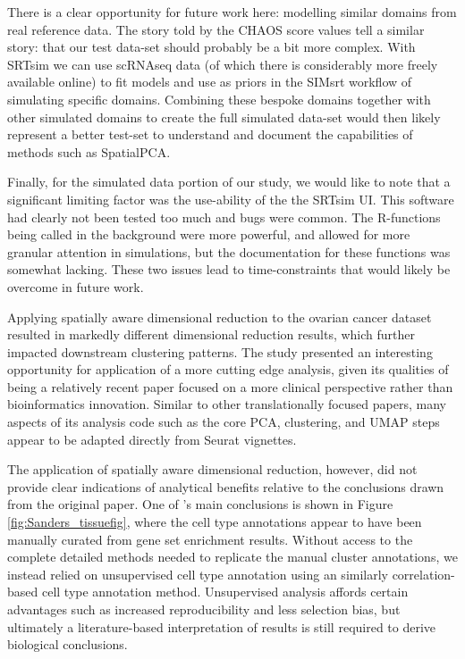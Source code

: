 \documentclass{article}
\begin{document}
There is a clear opportunity for future work here: modelling similar domains from real reference data. The story told by the CHAOS score values tell a similar story: that our test data-set should probably be a bit more complex. With SRTsim we can use scRNAseq data (of which there is considerably more freely available online) to fit models and use as priors in the SIMsrt workflow of simulating specific domains. Combining these bespoke domains together with other simulated domains to create the full simulated data-set would then likely represent a better test-set to understand and document the capabilities of methods such as SpatialPCA. 

Finally, for the simulated data portion of our study, we would like to note that a significant limiting factor was the use-ability of the the SRTsim UI. This software had clearly not been tested too much and bugs were common. The R-functions being called in the background were more powerful, and allowed for more granular attention in simulations, but the documentation for these functions was somewhat lacking. These two issues lead to time-constraints that would likely be overcome in future work.

Applying spatially aware dimensional reduction to the ovarian cancer dataset resulted in markedly different dimensional reduction results, which further impacted downstream clustering patterns. The \citet{sanders_small_2022} study presented an interesting opportunity for application of a more cutting edge analysis, given its qualities of being a relatively recent paper focused on a more clinical perspective rather than bioinformatics innovation. Similar to other translationally focused papers, many aspects of its analysis code such as the core PCA, clustering, and UMAP steps appear to be adapted directly from Seurat vignettes.

The application of spatially aware dimensional reduction, however, did not provide clear indications of analytical benefits relative to the conclusions drawn from the original paper. One of \citet{sanders_small_2022}'s main conclusions is shown in Figure \ref{fig:Sanders_tissuefig}, where the cell type annotations appear to have been manually curated from gene set enrichment results. Without access to the complete detailed methods needed to replicate the manual cluster annotations, we instead relied on unsupervised cell type annotation using an similarly correlation-based cell type annotation method. Unsupervised analysis affords certain advantages such as increased reproducibility and less selection bias, but ultimately a literature-based interpretation of results is still required to derive biological conclusions.
\end{document}
